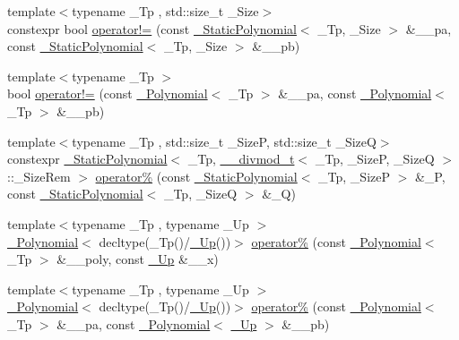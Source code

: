 \begin{DoxyCompactItemize}
\item 
{\footnotesize template$<$typename \+\_\+\+Tp , std\+::size\+\_\+t \+\_\+\+Size$>$ }\\constexpr bool \hyperlink{namespace____gnu__cxx_ac759e59bd5e23de4cbd603b846081718}{operator!=} (const \hyperlink{class____gnu__cxx_1_1__StaticPolynomial}{\+\_\+\+Static\+Polynomial}$<$ \+\_\+\+Tp, \+\_\+\+Size $>$ \&\+\_\+\+\_\+pa, const \hyperlink{class____gnu__cxx_1_1__StaticPolynomial}{\+\_\+\+Static\+Polynomial}$<$ \+\_\+\+Tp, \+\_\+\+Size $>$ \&\+\_\+\+\_\+pb)
\item 
{\footnotesize template$<$typename \+\_\+\+Tp $>$ }\\bool \hyperlink{namespace____gnu__cxx_a1279934a2d6df66704c6eab9113b0f97}{operator!=} (const \hyperlink{class____gnu__cxx_1_1__Polynomial}{\+\_\+\+Polynomial}$<$ \+\_\+\+Tp $>$ \&\+\_\+\+\_\+pa, const \hyperlink{class____gnu__cxx_1_1__Polynomial}{\+\_\+\+Polynomial}$<$ \+\_\+\+Tp $>$ \&\+\_\+\+\_\+pb)
\item 
{\footnotesize template$<$typename \+\_\+\+Tp , std\+::size\+\_\+t \+\_\+\+SizeP, std\+::size\+\_\+t \+\_\+\+SizeQ$>$ }\\constexpr \hyperlink{class____gnu__cxx_1_1__StaticPolynomial}{\+\_\+\+Static\+Polynomial}$<$ \+\_\+\+Tp, \hyperlink{struct____gnu__cxx_1_1____divmod__t}{\+\_\+\+\_\+divmod\+\_\+t}$<$ \+\_\+\+Tp, \+\_\+\+SizeP, \+\_\+\+SizeQ $>$\+::\+\_\+\+Size\+Rem $>$ \hyperlink{namespace____gnu__cxx_a15445a05944d0b0235051dbfb380f9bf}{operator\%} (const \hyperlink{class____gnu__cxx_1_1__StaticPolynomial}{\+\_\+\+Static\+Polynomial}$<$ \+\_\+\+Tp, \+\_\+\+SizeP $>$ \&\+\_\+P, const \hyperlink{class____gnu__cxx_1_1__StaticPolynomial}{\+\_\+\+Static\+Polynomial}$<$ \+\_\+\+Tp, \+\_\+\+SizeQ $>$ \&\+\_\+Q)
\item 
{\footnotesize template$<$typename \+\_\+\+Tp , typename \+\_\+\+Up $>$ }\\\hyperlink{class____gnu__cxx_1_1__Polynomial}{\+\_\+\+Polynomial}$<$ decltype(\+\_\+\+Tp()/\hyperlink{namespace____gnu__cxx_ab693ea357b6429b331e0bf09f9442385}{\+\_\+\+Up}())$>$ \hyperlink{namespace____gnu__cxx_a3132828069a740986e97f1db8e07325c}{operator\%} (const \hyperlink{class____gnu__cxx_1_1__Polynomial}{\+\_\+\+Polynomial}$<$ \+\_\+\+Tp $>$ \&\+\_\+\+\_\+poly, const \hyperlink{namespace____gnu__cxx_ab693ea357b6429b331e0bf09f9442385}{\+\_\+\+Up} \&\+\_\+\+\_\+x)
\item 
{\footnotesize template$<$typename \+\_\+\+Tp , typename \+\_\+\+Up $>$ }\\\hyperlink{class____gnu__cxx_1_1__Polynomial}{\+\_\+\+Polynomial}$<$ decltype(\+\_\+\+Tp()/\hyperlink{namespace____gnu__cxx_ab693ea357b6429b331e0bf09f9442385}{\+\_\+\+Up}())$>$ \hyperlink{namespace____gnu__cxx_a13dae497264694313717a5aa70407de5}{operator\%} (const \hyperlink{class____gnu__cxx_1_1__Polynomial}{\+\_\+\+Polynomial}$<$ \+\_\+\+Tp $>$ \&\+\_\+\+\_\+pa, const \hyperlink{class____gnu__cxx_1_1__Polynomial}{\+\_\+\+Polynomial}$<$ \hyperlink{namespace____gnu__cxx_ab693ea357b6429b331e0bf09f9442385}{\+\_\+\+Up} $>$ \&\+\_\+\+\_\+pb)

\end{DoxyCompactItemize}
